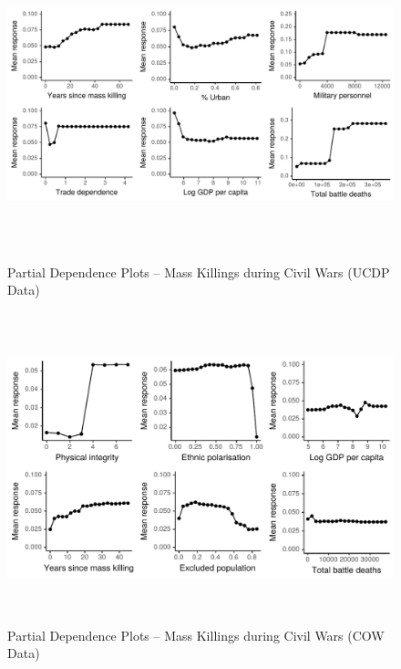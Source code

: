 \vspace{1cm}

\begin{figure}[h!]
\begin{center}
\includegraphics[width=\textwidth, height=9cm]{images/drfdpp2.pdf}
\caption{Partial Dependence Plots -- Mass Killings during Civil Wars (UCDP Data)}
\label{fig:drfdpp2}
\end{center}
\end{figure}


\begin{figure}[h!]
\begin{center}
\includegraphics[width=\textwidth, height=9cm]{images/drfdpp3.pdf}
\caption{Partial Dependence Plots -- Mass Killings during Civil Wars (COW Data)}
\label{fig:drfdpp3}
\end{center}
\end{figure}


